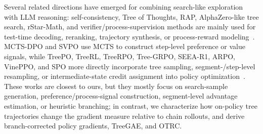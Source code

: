 Several related directions have emerged for combining search-like exploration with LLM reasoning: self-consistency, Tree of Thoughts, RAP, AlphaZero-like tree search, rStar-Math, and verifier/process-supervision methods are mainly used for test-time decoding, reranking, trajectory synthesis, or process-reward modeling~\citep{wang2022self,yao2023tree,hao2023reasoning,ref_alphazerollm,guan2025rstar,cobbe2021training,lightman2024let,wang2024math}. MCTS-DPO and SVPO use MCTS to construct step-level preference or value signals, while TreePO, TreeRL, TreeRPO, Tree-GRPO, SEEA-R1, ARPO, VinePPO, and SPO more directly incorporate tree sampling, segment-/step-level resampling, or intermediate-state credit assignment into policy optimization~\citep{xie2024monte,chen2024step,ref_treepo,ref_treerl,yang2025treerpo,ref_treegrpo,ref_seear1,ref_arpo,kazemnejad2024vineppo,guo2026segment}. These works are closest to ours, but they mostly focus on search-sample generation, preference/process-signal construction, segment-level advantage estimation, or heuristic branching; in contrast, we characterize how on-policy tree trajectories change the gradient measure relative to chain rollouts, and derive branch-corrected policy gradients, TreeGAE, and OTRC.
